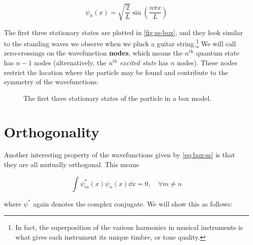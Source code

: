 \begin{tcolorbox}[title=Stationary state solutions] \vspace{-2ex}
	\begin{equation}
		\psi_n(x) = \sqrt{\frac{2}{L}} \sin \left(\frac{n\pi x}{L}\right) \label{eq:box-ss}
	\end{equation}
\end{tcolorbox}

The first three stationary states are plotted in \autoref{fig:ss-box}, and they look similar to the standing waves we observe when we pluck a guitar string.\footnote{In fact, the superposition of the various harmonics in musical instruments is what gives each instrument its unique timbre, or tone quality.} 
We will call zero-crossings on the wavefunction \textbf{nodes}, which means the $n^{\text{th}}$ quantum state has $n - 1$ nodes (alternatively, the $n^{\text{th}}$ \emph{excited state} has $n$ nodes). 
These nodes restrict the location where the particle may be found and contribute to the symmetry of the wavefunctions.

\begin{figure}[!h]
	\centering
	\caption{The first three stationary states of the particle in a box model.}
	\label{fig:ss-box}
\end{figure}


\section{Orthogonality}

Another interesting property of the wavefunctions given by \autoref{eq:box-ss} is that they are all mutually orthogonal. 
This means 

\begin{equation*}
	\int \psi_m^*(x) \psi_n(x) \dd{x} = 0, \quad \forall m \neq n
\end{equation*}

\noindent where $\psi^*$ again denotes the complex conjugate. 
We will show this as follows:

